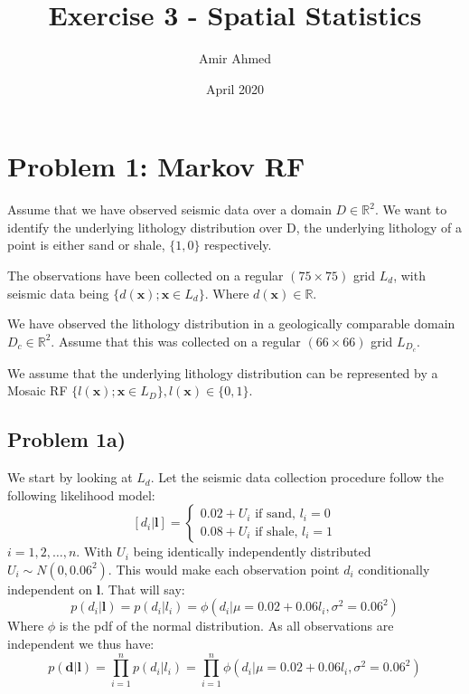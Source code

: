 \documentclass{article}
\title{Exercise 3 - Spatial Statistics}
\author{Amir Ahmed}
\date{April 2020}
\newcommand{\vect}[1]{\ensuremath{\boldsymbol{\mathbf{#1}}}}
\begin{document}
	\maketitle
	
	\section*{Problem 1: Markov RF}
	Assume that we have observed seismic data over a domain $D \in \mathbb{R}^2$. We want to identify the underlying lithology distribution over D, the underlying lithology of a point is either sand or shale, $\lbrace 1, 0 \rbrace$ respectively.
	
	The observations have been collected on a regular $(75 \times 75)$ grid $L_d$, with seismic data being $\lbrace d(\vect x); \vect x \in L_d \rbrace$. Where $d(\vect x) \in \mathbb{R}$. 
	
	We have observed the lithology distribution in a geologically comparable domain $D_c \in \mathbb{R}^2$. Assume that this was collected on a regular $(66 \times 66)$ grid $L_{D_c}$. 
	
	We assume that the underlying lithology distribution can be represented by a Mosaic RF $\lbrace l(\vect x); \vect x \in  L_D\rbrace, l(\vect x) \in \lbrace 0, 1 \rbrace$.  
	
	
	\subsection*{Problem 1a)}
	 We start by looking at $L_d$.
	 Let the seismic data collection procedure follow the following likelihood model: 
	 $$\left[d_i | \vect l \right] = \begin{cases}
	 0.02 + U_i \text{ if sand, } l_i = 0 \\
	 0.08 + U_i \text{ if shale, } l_i = 1
	 \end{cases}$$
	 $i = 1, 2, \dots, n$. With $U_i$ being identically independently distributed $U_i \sim N(0, 0.06^2)$. This would make each observation point $d_i$ conditionally independent on $\vect l$. That will say: 
	\begin{equation}
		p(d_i | \vect l) = p(d_i | l_i) = \phi(d_i |\mu = 0.02 + 0.06l_i, \sigma^2 = 0.06^2)
	\end{equation}	
	 Where $\phi$ is the pdf of the normal distribution. As all observations are independent we thus have: 
	 \begin{equation}\label{eq:cond_prob}
	 	p(\vect d | \vect l) = \prod_{i=1}^{n}p(d_i | l_i) = \prod_{i=1}^{n}  \phi(d_i |\mu = 0.02 + 0.06l_i, \sigma^2 = 0.06^2)
	 \end{equation} 
	 
\end{document}
